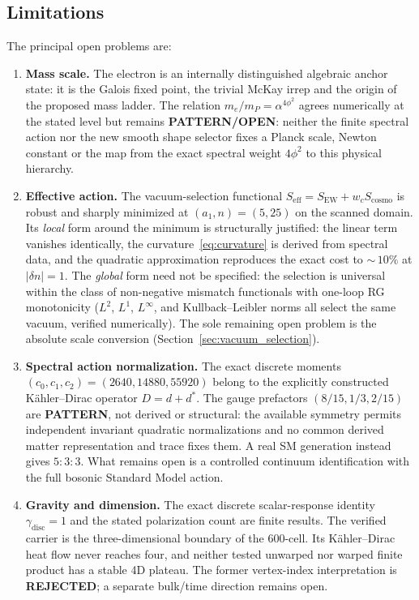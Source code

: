 \documentclass[12pt,a4paper]{article}
\theoremstyle{definition}
\begin{document}
\subsection{Limitations}
\label{sec:limitations}

The principal open problems are:
\begin{enumerate}
\item \textbf{Mass scale.}  The electron is an internally distinguished algebraic anchor state: it is the Galois fixed point, the trivial McKay irrep and the origin of the proposed mass ladder.  The relation $m_e/m_P=\alpha^{4\phi^2}$ agrees numerically at the stated level but remains \textbf{PATTERN/OPEN}: neither the finite spectral action nor the new smooth shape selector fixes a Planck scale, Newton constant or the map from the exact spectral weight $4\phi^2$ to this physical hierarchy.
\item \textbf{Effective action.} The vacuum-selection functional $S_{\mathrm{eff}} = S_{\mathrm{EW}} + w_c S_{\mathrm{cosmo}}$ is robust and sharply minimized at $(a_1,n) = (5,25)$ on the scanned domain.  Its \emph{local} form around the minimum is structurally justified: the linear term vanishes identically, the curvature~\eqref{eq:curvature} is derived from spectral data, and the quadratic approximation reproduces the exact cost to ${\sim}\,10\%$ at $|\delta n| = 1$.  The \emph{global} form need not be specified: the selection is universal within the class of non-negative mismatch functionals with one-loop RG monotonicity ($L^2$, $L^1$, $L^\infty$, and Kullback--Leibler norms all select the same vacuum, verified numerically).  The sole remaining open problem is the absolute scale conversion (Section~\ref{sec:vacuum_selection}).
\item \textbf{Spectral action normalization.} The exact discrete moments $(c_0,c_1,c_2) = (2640,14880,55920)$ belong to the explicitly constructed K\"ahler--Dirac operator $D=d+d^*$.  The gauge prefactors $(8/15,1/3,2/15)$ are \textbf{PATTERN}, not derived or structural: the available symmetry permits independent invariant quadratic normalizations and no common derived matter representation and trace fixes them.  A real SM generation instead gives $5:3:3$.  What remains open is a controlled continuum identification with the full bosonic Standard Model action.
\item \textbf{Gravity and dimension.} The exact discrete scalar-response identity $\gamma_{\mathrm{disc}} = 1$ and the stated polarization count are finite results.  The verified carrier is the three-dimensional boundary of the 600-cell.  Its K\"ahler--Dirac heat flow never reaches four, and neither tested unwarped nor warped finite product has a stable 4D plateau.  The former vertex-index interpretation is \textbf{REJECTED}; a separate bulk/time direction remains open.

\end{enumerate}
\end{document}
